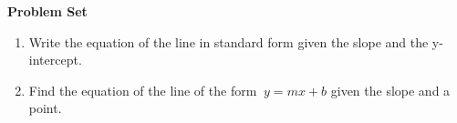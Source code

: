 \textbf{Problem Set}

\vspce

\begin{enumerate}[label = \Alph*. ]
\item Write the equation of the line in standard form given the slope and the y-intercept. 
\begin{enumerate}[label = \arabic*. ]
\end{enumerate}  

\item Find the equation of  the line of the form  $\ { y  =  mx  +  b}$   given the slope and a point.
\begin{enumerate}[label = \arabic*. ]
\end{enumerate}  
 

\end{enumerate} 

